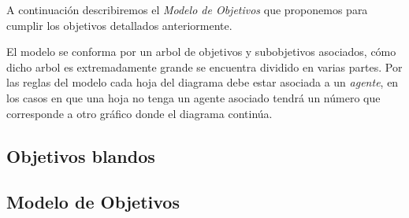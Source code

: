 \documentclass[11pt, a4paper, spanish]{article}
\begin{document}
	A continuaci\'on describiremos el \emph{Modelo de Objetivos} que proponemos para cumplir los objetivos detallados anteriormente.

	El modelo se conforma por un arbol de objetivos y subobjetivos asociados, c\'omo dicho arbol es extremadamente grande se encuentra 
	dividido en varias partes. Por las reglas del modelo cada hoja del diagrama debe estar asociada a un \emph{agente}, en los casos en que
	una hoja no tenga un agente asociado tendr\'a un n\'umero que corresponde a otro gr\'afico donde el diagrama contin\'ua.
	
\subsection{Objetivos blandos}

\subsection{Modelo de Objetivos}
\end{document}
